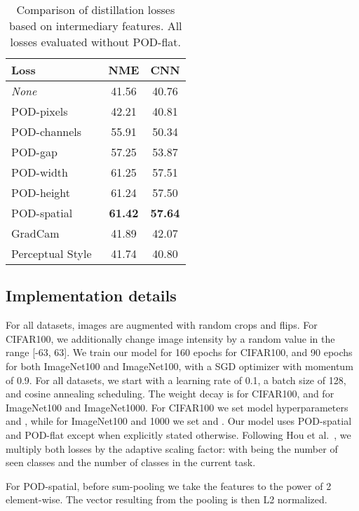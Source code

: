 \documentclass[runningheads]{llncs}
\begin{document}
\begin{table*}[!htbp]
\centering
\caption{Comparison of distillation losses based on intermediary features. All losses evaluated without POD-flat.}
\begin{tabular}{@{}lcc@{}}
 \toprule
 Loss      & NME & CNN\\
 \midrule
 \textit{None}                  & 41.56  & 40.76\\
 POD-pixels                     & 42.21  & 40.81 \\
 POD-channels                   & 55.91  & 50.34\\
 POD-gap                        & 57.25  & 53.87\\
 POD-width                      & 61.25  & 57.51\\
 POD-height                     & 61.24  & 57.50\\
 POD-spatial                    & \textbf{61.42} & \textbf{57.64}\\
 \hdashline
 GradCam~\cite{dhar2019learning_without_memorizing_gradcam}              & 41.89 & 42.07 \\
 Perceptual Style~\cite{johnson2016perceptual_losses}       & 41.74 & 40.80 \\
 \bottomrule
\end{tabular}
\label{tab:ablation_perceptual_noflat}
\end{table*}

\subsection{Implementation details}

For all datasets, images are augmented with random crops and flips. For CIFAR100, we additionally change image intensity by a random value in the range [-63, 63].
We train our model for 160 epochs for CIFAR100, and 90 epochs for both ImageNet100 and ImageNet100, with a SGD optimizer with momentum of 0.9. For all datasets, we start with a learning rate of 0.1, a batch size of 128, and cosine annealing scheduling.
The weight decay is  for CIFAR100, and  for ImageNet100 and ImageNet1000. For CIFAR100 we set model hyperparameters  and , while for ImageNet100 and 1000 we set  and . Our model uses POD-spatial and POD-flat except when explicitly stated otherwise. Following Hou et al.~\cite{hou2019ucir}, we multiply both losses by the adaptive scaling factor:  with  being the number of seen classes and  the number of classes in the current task.

For POD-spatial, before sum-pooling we take the features to the power of 2 element-wise. The vector resulting from the pooling is then L2 normalized. 
\end{document}
